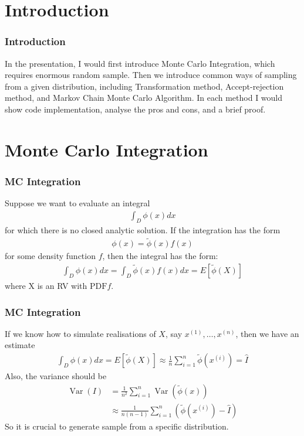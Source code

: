\frame[plain]{\titlepage}

\section{Introduction}

\begin{frame}
    \frametitle{Introduction}
    
    In the presentation, I would first introduce Monte Carlo Integration, which requires enormous random sample. Then we introduce common ways of sampling from a given distribution, including Transformation method, Accept-rejection method, and Markov Chain Monte Carlo Algorithm. In each method I would show code implementation, analyse the pros and cons, and a brief proof.
    
\end{frame}
\section{Monte Carlo Integration}
\begin{frame}
    \frametitle{MC Integration}
    Suppose we want to evaluate an integral
    \begin{align*}
    \int_D \phi(x) d x
    \end{align*}
    for which there is no closed analytic solution. If the integration has the form
    \begin{align*}
    \phi(x)=\tilde{\phi}(x) f(x)
    \end{align*}
    for some density function \(f\), then the integral has the form:
    \begin{align*}
    \int_D \phi(x) d x=\int_D \tilde{\phi}(x) f(x) d x=E[\tilde{\phi}(X)]
    \end{align*}
    where \(\mathrm{X}\) is an RV with \(\mathrm{PDF} f\). 

    

\end{frame}
\begin{frame}
    \frametitle{MC Integration}
    If we know how to simulate realisations of \(X\), say \(x^{(1)}, \ldots, x^{(n)}\), then we have an estimate
    \begin{align*}
    \int_D \phi(x) d x=E[\tilde{\phi}(X)] \approx \frac{1}{n} \sum_{i=1}^n \tilde{\phi}\left(x^{(i)}\right)=\hat{I}
    \end{align*}
    Also, the variance should be
    \begin{align*}
        \operatorname{Var}(I) &= \frac{1}{n^2} \sum_{i=1}^n \operatorname{Var}\left(\tilde{\phi}\left(x\right)\right) \\
        &\approx \frac{1}{n(n-1)} \sum_{i=1}^n \left(\tilde{\phi}\left(x^{(i)}\right) - \hat I\right)
    \end{align*}
    So it is crucial to generate sample from a specific distribution.

    

\end{frame}
